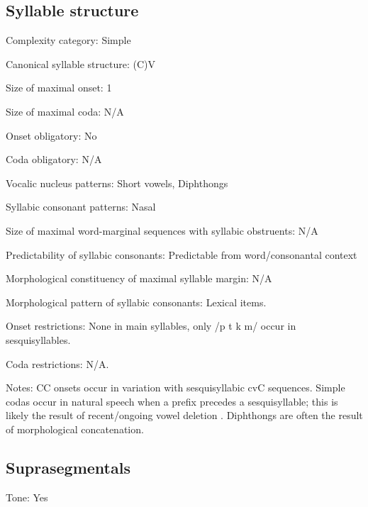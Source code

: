 {\subsection*{Syllable structure}
\begin{appendixdesc}

\item[Complexity category:] Simple

\item[Canonical syllable structure:] (C)V \citep[57--64]{Teo2009}

\item[Size of maximal onset:] 1

\item[Size of maximal coda:] N/A

\item[Onset obligatory:] No

\item[Coda obligatory:] N/A

\item[Vocalic nucleus patterns:] Short vowels, Diphthongs

\item[Syllabic consonant patterns:] Nasal

\item[Size of maximal word-marginal sequences with syllabic obstruents:] N/A

\item[Predictability of syllabic consonants:] Predictable from word/consonantal context

\item[Morphological constituency of maximal syllable margin:] N/A

\item[Morphological pattern of syllabic consonants:] Lexical items.

\item[Onset restrictions:] None in main syllables, only /p t k m/ occur in sesquisyllables.

\item[Coda restrictions:] N/A.

\item[Notes:] CC onsets occur in variation with sesquisyllabic cvC sequences. Simple codas occur in natural speech when a prefix precedes a sesquisyllable; this is likely the result of recent/ongoing vowel deletion \citep[62--64]{Teo2009}. Diphthongs are often the result of morphological concatenation.
\end{appendixdesc}
\subsection*{Suprasegmentals}
\begin{appendixdesc}
\item[Tone:] Yes


\end{appendixdesc}}
